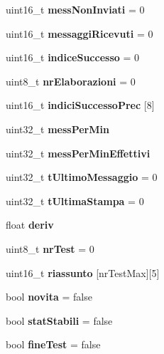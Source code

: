 \begin{DoxyCompactItemize}
\mbox{\label{_test__collisioni__master_8cpp_aad51ea4d8d724173f6124013a5c48296}} 
uint16\+\_\+t {\bfseries mess\+Non\+Inviati} = 0
\item 
\mbox{\label{_test__collisioni__master_8cpp_a9048445b2e03d4a7e802d73ca18184b8}} 
uint16\+\_\+t {\bfseries messaggi\+Ricevuti} = 0
\item 
\mbox{\label{_test__collisioni__master_8cpp_acafb00b7378a0a002783a4fa2d662330}} 
uint16\+\_\+t {\bfseries indice\+Successo} = 0
\item 
\mbox{\label{_test__collisioni__master_8cpp_a2e188ffff05b7f44a943333c52d5247a}} 
uint8\+\_\+t {\bfseries nr\+Elaborazioni} = 0
\item 
\mbox{\label{_test__collisioni__master_8cpp_a4d33fb494871ce9c147242218a398ac3}} 
uint16\+\_\+t {\bfseries indici\+Successo\+Prec} [8]
\item 
\mbox{\label{_test__collisioni__master_8cpp_a13da80fe40e76e40698fedab534f9182}} 
uint32\+\_\+t {\bfseries mess\+Per\+Min}
\item 
\mbox{\label{_test__collisioni__master_8cpp_a96ef447b9fe4a1e0a35c42ff3bd13bcb}} 
uint32\+\_\+t {\bfseries mess\+Per\+Min\+Effettivi}
\item 
\mbox{\label{_test__collisioni__master_8cpp_ae4f27fd6b4d47a79b22b2356828fb251}} 
uint32\+\_\+t {\bfseries t\+Ultimo\+Messaggio} = 0
\item 
\mbox{\label{_test__collisioni__master_8cpp_aa7d6cad000a6e144deb7c468f2ffe699}} 
uint32\+\_\+t {\bfseries t\+Ultima\+Stampa} = 0
\item 
\mbox{\label{_test__collisioni__master_8cpp_a1340607b937a9ca840b130d324c5c963}} 
float {\bfseries deriv}
\item 
\mbox{\label{_test__collisioni__master_8cpp_aa2dd6f9af1c91277cd2c8207c86c8833}} 
uint8\+\_\+t {\bfseries nr\+Test} = 0
\item 
\mbox{\label{_test__collisioni__master_8cpp_aa71a891e13493eeacb07637c65bed5eb}} 
uint16\+\_\+t {\bfseries riassunto} [nr\+Test\+Max][5]
\item 
\mbox{\label{_test__collisioni__master_8cpp_aab29c494e4d9ca13e5a5056302e458f8}} 
bool {\bfseries novita} = false
\item 
\mbox{\label{_test__collisioni__master_8cpp_ae86a50cbc0a60fb814272f55c2ca07d7}} 
bool {\bfseries stat\+Stabili} = false
\item 
\mbox{\label{_test__collisioni__master_8cpp_aa1f2cf31ff7840359a78c7521c8a2415}} 
bool {\bfseries fine\+Test} = false
\end{DoxyCompactItemize}


